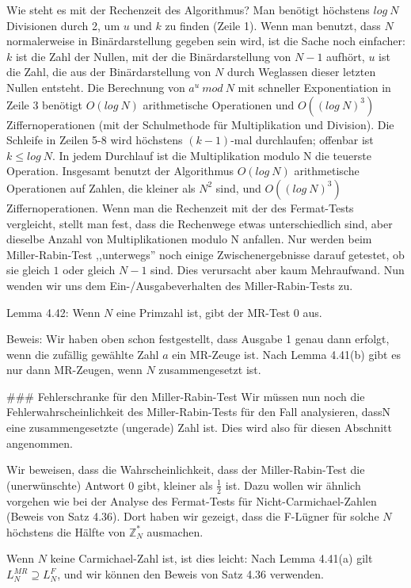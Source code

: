 \documentclass[a4paper]{article}
\begin{document}
\begin{multicols}{3}
Wie steht es mit der Rechenzeit des Algorithmus? Man benötigt höchstens $log\ N$ Divisionen durch 2, um $u$ und $k$ zu finden (Zeile 1). Wenn man benutzt, dass $N$ normalerweise in Binärdarstellung gegeben sein wird, ist die Sache noch einfacher: $k$ ist die Zahl der Nullen, mit der die Binärdarstellung von $N-1$ aufhört, $u$ ist die Zahl, die aus der Binärdarstellung von $N$ durch Weglassen dieser letzten Nullen entsteht. Die Berechnung von $a^u\ mod\ N$ mit schneller Exponentiation in Zeile 3 benötigt $O(log\ N)$ arithmetische Operationen und $O((log\ N)^3)$ Ziffernoperationen (mit der Schulmethode für Multiplikation und Division). Die Schleife in Zeilen 5-8 wird höchstens $(k-1)$-mal durchlaufen; offenbar ist $k\leq log\ N$. In jedem Durchlauf ist die Multiplikation modulo N die teuerste Operation. Insgesamt benutzt der Algorithmus $O(log\ N)$ arithmetische Operationen auf Zahlen, die kleiner als $N^2$ sind, und $O((log\ N)^3)$ Ziffernoperationen. Wenn man die Rechenzeit mit der des Fermat-Tests vergleicht, stellt man fest, dass die Rechenwege etwas unterschiedlich sind, aber dieselbe Anzahl von Multiplikationen modulo N anfallen. Nur werden beim Miller-Rabin-Test ,,unterwegs'' noch einige Zwischenergebnisse darauf getestet, ob sie gleich $1$ oder gleich $N-1$ sind. Dies verursacht aber kaum Mehraufwand.
Nun wenden wir uns dem Ein-/Ausgabeverhalten des Miller-Rabin-Tests zu.

Lemma 4.42: Wenn $N$ eine Primzahl ist, gibt der MR-Test $0$ aus.

Beweis: Wir haben oben schon festgestellt, dass Ausgabe 1 genau dann erfolgt, wenn die zufällig gewählte Zahl $a$ ein MR-Zeuge ist. Nach Lemma 4.41(b) gibt es nur dann
MR-Zeugen, wenn $N$ zusammengesetzt ist. 

### Fehlerschranke für den Miller-Rabin-Test
Wir müssen nun noch die Fehlerwahrscheinlichkeit des Miller-Rabin-Tests für den Fall analysieren, dassN eine zusammengesetzte (ungerade) Zahl ist. Dies wird also für diesen Abschnitt angenommen.

Wir beweisen, dass die Wahrscheinlichkeit, dass der Miller-Rabin-Test die (unerwünschte) Antwort $0$ gibt, kleiner als $\frac{1}{2}$ ist. Dazu wollen wir ähnlich vorgehen wie bei der Analyse des Fermat-Tests für Nicht-Carmichael-Zahlen (Beweis von Satz 4.36). Dort haben wir gezeigt, dass die F-Lügner für solche $N$ höchstens die Hälfte von $\mathbb{Z}^*_N$ ausmachen.

Wenn $N$ keine Carmichael-Zahl ist, ist dies leicht: Nach Lemma 4.41(a) gilt $L^{MR}_N \supseteq L^F_N$, und wir können den Beweis von Satz 4.36 verwenden.


\end{multicols}
\end{document}
